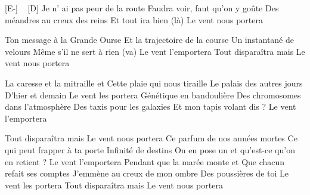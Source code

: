 
[E-] ~ [D]
Je n' ai pas peur de la route
Faudra voir, faut qu'on y goûte
Des méandres au creux des reins
Et tout ira bien (là)
Le vent nous portera

Ton message à la Grande Ourse
Et la trajectoire de la course
Un instantané de velours
Même s'il ne sert à rien (va)
Le vent l'emportera
Tout disparaîtra mais
Le vent nous portera

La caresse et la mitraille
et Cette plaie qui nous tiraille
Le palais des autres jours
D'hier et demain
Le vent les portera
Génétique en bandoulière
Des chromosomes dans l'atmosphère
Des taxis pour les galaxies
Et mon tapis volant dis ?
Le vent l'emportera

Tout disparaîtra mais
Le vent nous portera
Ce parfum de nos années mortes
Ce qui peut frapper à ta porte
Infinité de destins
On en pose un et qu'est-ce qu'on en retient ?
Le vent l'emportera
Pendant que la marée monte
et Que chacun refait ses comptes
J'emmène au creux de mon ombre
Des poussières de toi
Le vent les portera
Tout disparaîtra mais
Le vent nous portera 